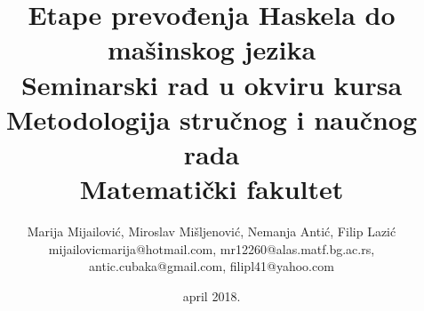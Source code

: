\documentclass[a4paper]{article}
\begin{document}
\title{Etape prevođenja Haskela do mašinskog jezika\\ \small{Seminarski rad u okviru kursa\\Metodologija stručnog i naučnog rada\\ Matematički fakultet}}

\author{Marija Mijailović, Miroslav Mišljenović, Nemanja Antić, Filip Lazić\\ mijailovicmarija@hotmail.com, mr12260@alas.matf.bg.ac.rs,\\ antic.cubaka@gmail.com, filipl41@yahoo.com}
\date{april 2018.}
\maketitle



\tableofcontents

\newpage








\appendix
 


%
\end{document}
